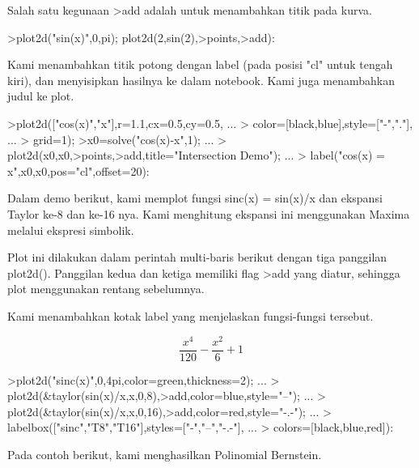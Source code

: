 \documentclass[a4paper,10pt]{article}
\begin{document}
\begin{eulernotebook}
\begin{eulercomment}
\begin{eulercomment}
\begin{eulercomment}
\begin{eulercomment}
\begin{eulercomment}
\begin{eulercomment}
\begin{eulercomment}
Salah satu kegunaan \textgreater{}add adalah untuk menambahkan titik pada kurva.
\end{eulercomment}
\begin{eulerprompt}
>plot2d("sin(x)",0,pi); plot2d(2,sin(2),>points,>add):
\end{eulerprompt}
\begin{eulercomment}
Kami menambahkan titik potong dengan label (pada posisi "cl" untuk
tengah kiri), dan menyisipkan hasilnya ke dalam notebook. Kami juga
menambahkan judul ke plot.
\end{eulercomment}
\begin{eulerprompt}
>plot2d(["cos(x)","x"],r=1.1,cx=0.5,cy=0.5, ...
>  color=[black,blue],style=["-","."], ...
>  grid=1);
>x0=solve("cos(x)-x",1);  ...
>  plot2d(x0,x0,>points,>add,title="Intersection Demo");  ...
>  label("cos(x) = x",x0,x0,pos="cl",offset=20):
\end{eulerprompt}
\begin{eulercomment}
Dalam demo berikut, kami memplot fungsi sinc(x) = sin(x)/x dan
ekspansi Taylor ke-8 dan ke-16 nya. Kami menghitung ekspansi ini
menggunakan Maxima melalui ekspresi simbolik.

Plot ini dilakukan dalam perintah multi-baris berikut dengan tiga
panggilan plot2d(). Panggilan kedua dan ketiga memiliki flag \textgreater{}add yang
diatur, sehingga plot menggunakan rentang sebelumnya.

Kami menambahkan kotak label yang menjelaskan fungsi-fungsi tersebut.
\end{eulercomment}
\begin{eulerformula}
\[
\frac{x^4}{120}-\frac{x^2}{6}+1
\]
\end{eulerformula}
\begin{eulerprompt}
>plot2d("sinc(x)",0,4pi,color=green,thickness=2); ...
>  plot2d(&taylor(sin(x)/x,x,0,8),>add,color=blue,style="--"); ...
>  plot2d(&taylor(sin(x)/x,x,0,16),>add,color=red,style="-.-"); ...
>  labelbox(["sinc","T8","T16"],styles=["-","--","-.-"], ...
>    colors=[black,blue,red]):
\end{eulerprompt}
\begin{eulercomment}
Pada contoh berikut, kami menghasilkan Polinomial Bernstein.


\end{eulercomment}
\end{eulercomment}
\end{eulercomment}
\end{eulercomment}
\end{eulercomment}
\end{eulercomment}
\end{eulercomment}
\end{eulernotebook}
\end{document}
